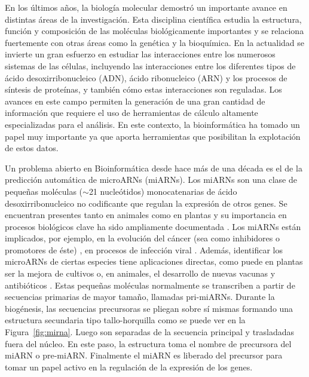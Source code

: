 En los últimos años, la biología molecular demostró un importante avance en distintas áreas de la investigación. Esta disciplina científica
estudia la estructura, función y composición de las moléculas biológicamente importantes y se relaciona fuertemente con otras áreas como la
genética y la bioquímica. En la actualidad se invierte un gran esfuerzo en estudiar las interacciones entre los numerosos sistemas de las células,
incluyendo las interacciones entre los diferentes tipos de ácido desoxirribonucleico (ADN), ácido ribonucleico (ARN) y los procesos de síntesis de
proteínas, y también cómo estas interacciones son reguladas. Los avances en este campo permiten la generación de una gran cantidad de información
que requiere el uso de herramientas de cálculo altamente especializadas para el análisis. En este contexto, la bioinformática ha tomado un papel muy
importante ya que aporta herramientas que posibilitan la explotación de estos datos.

Un problema abierto en Bioinformática desde hace más de una década es el de la predicción automática de microARNs (miARNs). Los miARNs son una clase de
pequeñas moléculas ($\sim$21 nucleótidos) monocatenarias de ácido desoxirribonucleico no codificante que regulan la expresión de otros genes. Se
encuentran presentes tanto en animales como en plantas y su importancia en procesos biológicos clave ha sido ampliamente documentada
\citep{rosenzvit2013microrna}. Los miARNs están implicados, por ejemplo, en la evolución del cáncer (sea como inhibidores o promotores de éste)
\citep{yu2015microrna}, en procesos de infección viral \citep{lecellier2005}. Además, identificar los microARNs de ciertas especies tiene aplicaciones
directas, como puede en plantas ser la mejora de cultivos \citep{liu2010new} o, en animales,  el desarrollo de nuevas vacunas y antibióticos
\citep{tsetsarkin2017synergistic}. Estas pequeñas moléculas normalmente se transcriben a partir de secuencias primarias de mayor tamaño, llamadas
pri-miARNs. Durante la biogénesis, las secuencias precursoras se pliegan sobre sí mismas formando una estructura secundaria tipo tallo-horquilla como se
puede ver en la Figura~\ref{fig:mirna}. Luego son separadas de la secuencia principal y trasladadas fuera del núcleo. En este paso, la estructura toma el
nombre de precursora del miARN o pre-miARN. Finalmente el miARN es liberado del precursor para tomar un papel activo en la regulación de la expresión de los
genes.

